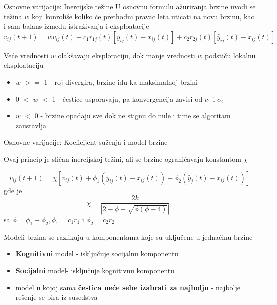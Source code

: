 \documentclass{beamer}
\begin{document}
\begin{frame}{Osnovne varijacije: Inercijske težine}
U osnovnu formulu ažuriranja brzine uvodi se težina \alert{$w$} koji konroliše koliko će prethodni pravac leta uticati na novu brzinu, kao i sam balans između istraživanja i eksploatacije 
\[v_{ij}(t+1) = wv_{ij}(t) + c_1r_{1j}(t)[y_{ij}(t) - x_{ij}(t)] + c_2r_{2j}(t)[\hat{y}_{ij}(t) - x_{ij}(t)] \]

Veće vrednosti $w$ olakšavaju eksploraciju, dok manje vrednosti $w$ podstiču lokalnu eksploataciju

\begin{itemize}
    \item $w$ $>=$ 1 - roj divergira, brzine idu ka maksimalnoj brzini
    \item 0 $<$ $w$ $<$ 1  -  čestice usporavaju, pa konvergencija zavisi od $c_1$ i $c_2$
    \item $w$ $<$ 0 -  brzine opadaju sve dok ne stignu do nule i time se algoritam zaustavlja
\end{itemize}

\end{frame}

\begin{frame}{Osnovne varijacije: Koeficijent suženja i model brzine}

Ovaj princip je sličan inercijskoj težini, ali se brzine ograničavaju konstantom $\chi$

\[v_{ij} (t + 1) = \chi[v_{ij} (t) + \phi_1 (y_{ij} (t) - x_{ij} (t)) + \phi_2 (\hat{y}_j (t) - x_{ij} (t))]\]
gde je $$\chi = \frac{2k}{|2-\phi-\sqrt{\phi(\phi-4)}|},$$sa $\phi = \phi_1 +  \phi_2 , \phi_1 = c_1r_1$ i $\phi_2 = c_2r_2$\

Modeli brzina se razlikuju u komponentama koje su uključene u jednačinu brzine
\begin{itemize}
    \item \textbf{Kognitivni} model - isključuje socijalnu komponentu
    \item \textbf{Socijalni} model- isključuje kognitivnu komponentu
    \item model u kojoj sama \textbf{čestica neće sebe izabrati za najbolju} - najbolje rešenje se bira iz susedstva
    
\end{itemize}

\end{frame}
\end{document}
